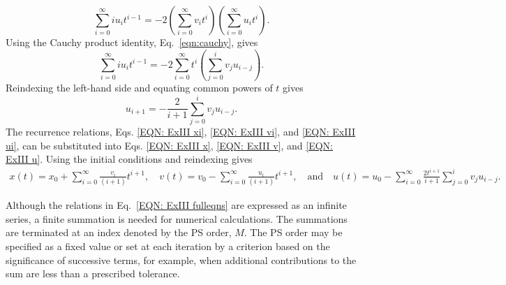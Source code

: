 \documentclass[draft]{agujournal2019}
\begin{document}
    \begin{equation*}
         \sum_{i=0}^\infty iu_it^{i-1}=-2\left( \sum_{i=0}^\infty v_it^i \right)\left( \sum_{i=0}^\infty u_it^i\right).
    \end{equation*}
Using the Cauchy product identity, Eq.~\eqref{eqn:cauchy}, gives
   \begin{equation*}
         \sum_{i=0}^\infty iu_it^{i-1}=-2\sum_{i=0}^\infty t^i\left(\sum_{j=0}^i v_ju_{i-j}\right).
    \end{equation*}
Reindexing the left-hand side and equating common powers of $t$ gives
    \begin{equation}\label{EQN: ExIII ui}
         u_{i+1}=-\frac{2}{i+1}\sum_{j=0}^iv_ju_{i-j}.
    \end{equation}
The recurrence relations, Eqs. \eqref{EQN: ExIII xi}, \eqref{EQN: ExIII vi}, and \eqref{EQN: ExIII ui}, can be substituted into Eqs. \eqref{EQN: ExIII x}, \eqref{EQN: ExIII v}, and \eqref{EQN: ExIII u}. Using the initial conditions and reindexing gives
    \begin{gather} \label{EQN: ExIII fulleqns}
        x(t)= x_0 + \sum_{i=0}^\infty\frac{v_i}{(i+1)} t^{i+1},\quad
        v(t)= v_0 - \sum_{i=0}^\infty \frac{u_i}{(i+1)}t^{i+1}, \quad\mbox{and}\quad        
        u(t)=u_0 - \sum_{i=0}^\infty \frac{2t^{i+1}}{i+1}\sum_{j=0}^iv_ju_{i-j}.
    \end{gather}

Although the relations in Eq.~\eqref{EQN: ExIII fulleqns} are expressed as an infinite series, a finite summation is needed for numerical calculations. The summations are terminated at an index denoted by the PS order, $M$. The PS order may be specified as a fixed value or set at each iteration by a criterion based on the significance of successive terms, for example, when additional contributions to the sum are less than a prescribed tolerance.
\end{document}
